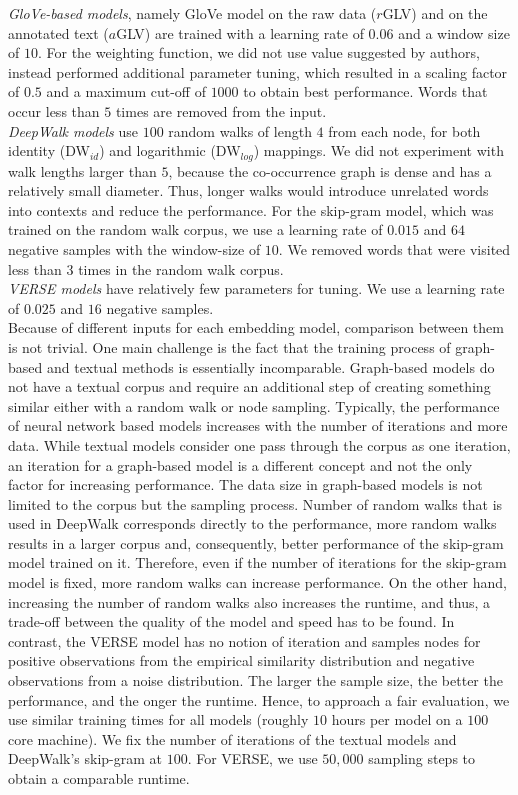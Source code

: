 \noindent
\emph{GloVe-based models}, namely GloVe model on the raw data ($r$GLV) and on the annotated text ($a$GLV) are trained with a learning rate of $0.06$ and a window size of $10$. For the weighting function, we did not use value suggested by authors, instead performed additional parameter tuning, which resulted in a scaling factor of $0.5$ and a maximum cut-off of $1000$ to obtain best performance. Words that occur less than $5$ times are removed from the input.\\

\noindent
\emph{DeepWalk models} use $100$ random walks of length $4$ from each node, for both identity (DW$_{id}$) and logarithmic (DW$_{log}$) mappings. We did not experiment with walk lengths larger than $5$, because the co-occurrence graph is dense and has a relatively small diameter. Thus, longer walks would introduce unrelated words into contexts and reduce the performance. For the skip-gram model, which was trained on the random walk corpus, we use a learning rate of $0.015$ and $64$ negative samples with the window-size of $10$. We removed words that were visited less than $3$ times in the random walk corpus. \\

\noindent
\emph{VERSE models} have relatively few parameters for tuning. We use a learning rate of $0.025$ and $16$ negative samples.\\

\noindent
Because of different inputs for each embedding model, comparison between them is not trivial. One main challenge is the fact that the training process of graph-based and textual methods is essentially incomparable. Graph-based models do not have a textual corpus and require an additional step of creating something similar either with a random walk or node sampling. Typically, the performance of neural network based models increases with the number of iterations and more data. While textual models consider one pass through the corpus as one iteration, an iteration for a graph-based model is a different concept and not the only factor for increasing performance. The data size in graph-based models is not limited to the corpus but the sampling process. Number of random walks that is used in DeepWalk corresponds directly to the performance, more random walks results in a larger corpus and, consequently, better performance of the skip-gram model trained on it. Therefore, even if the number of iterations for the skip-gram model is fixed, more random walks can increase performance. On the other hand, increasing the number of random walks also increases the runtime, and thus, a trade-off between the quality of the model and speed has to be found. In contrast, the VERSE model has no notion of iteration and samples nodes for positive observations from the empirical similarity distribution and negative observations from a noise distribution. The larger the sample size, the better the performance, and the onger the runtime. Hence, to approach a fair evaluation, we use similar training times for all models (roughly $10$ hours per model on a $100$ core machine). We fix the number of iterations of the textual models and DeepWalk's skip-gram at $100$. For VERSE, we use $50,000$ sampling steps to obtain a comparable runtime.
